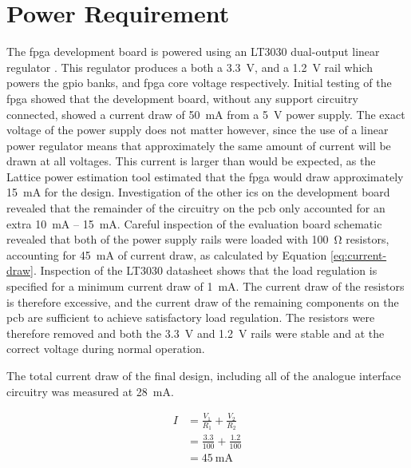 \section{Power Requirement} \label{sec:power requirement}
The \gls{fpga} development board is powered using an LT3030 dual-output linear regulator \cite{lattice2017b}. This regulator produces a both a \SI{3.3}{\volt}, and a \SI{1.2}{\volt} rail which powers the \gls{gpio} banks, and \gls{fpga} core voltage respectively. Initial testing of the \gls{fpga} showed that the development board, without any support circuitry connected, showed a current draw of \SI{50}{\milli\ampere} from a \SI{5}{\volt} power supply. The exact voltage of the power supply does not matter however, since the use of a linear power regulator means that approximately the same amount of current will be drawn at all voltages. This current is larger than would be expected, as the Lattice power estimation tool estimated that the \gls{fpga} would draw approximately \SI{15}{\milli\ampere} for the design. Investigation of the other \glspl{ic} on the development board revealed that the remainder of the circuitry on the \gls{pcb} only accounted for an extra \SI{10}{\milli\ampere} -- \SI{15}{\milli\ampere}. Careful inspection of the evaluation board schematic revealed that both of the power supply rails were loaded with \SI{100}{\ohm} resistors, accounting for \SI{45}{\milli\ampere} of current draw, as calculated by Equation \ref{eq:current-draw}. Inspection of the LT3030 datasheet shows that the load regulation is specified for a minimum current draw of \SI{1}{\milli\ampere}. The current draw of the resistors is therefore excessive, and the current draw of the remaining components on the \gls{pcb} are sufficient to achieve satisfactory load regulation. The resistors were therefore removed and both the \SI{3.3}{\volt} and \SI{1.2}{\volt} rails were stable and at the correct voltage during normal operation.


\newcommand{\delayLineCurrentMa}{28}

The total current draw of the final design, including all of the analogue interface circuitry was measured at \SI{\delayLineCurrentMa}{\milli\ampere}.

\begin{align}
I &= \frac{V_1}{R_1} + \frac{V_2}{R_2} \nonumber \\
&= \frac{3.3}{100} + \frac{1.2}{100} \nonumber \\
&= \SI{45}{\milli\ampere} \label{eq:current-draw}
\end{align}

